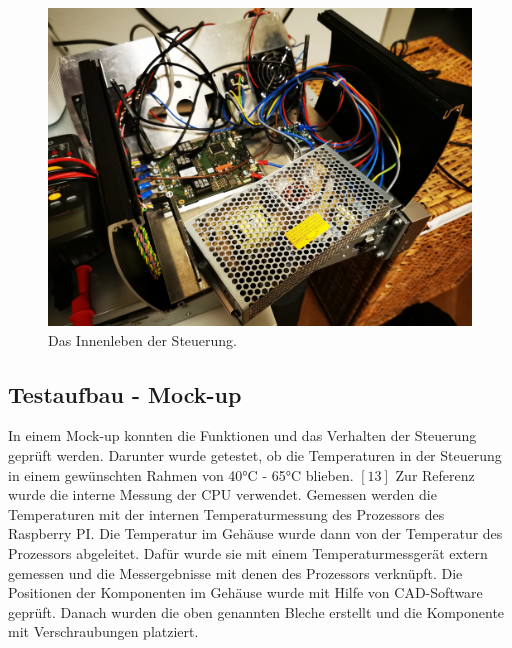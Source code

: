 \begin{figure}[H]
    \centering
    \includegraphics[scale=0.08]{98_images/housing_inside.jpg}
    \caption{Das Innenleben der Steuerung.}
    \label{fig:enter-label}
\end{figure}
\subsection{Testaufbau - Mock-up}
In einem Mock-up konnten die Funktionen und das Verhalten der Steuerung geprüft werden. Darunter wurde getestet, ob die Temperaturen in der Steuerung in einem gewünschten Rahmen von 40°C - 65°C blieben. $[13]$ Zur Referenz wurde die interne Messung der CPU verwendet. Gemessen werden die Temperaturen mit der internen Temperaturmessung des Prozessors des Raspberry PI. Die Temperatur im Gehäuse wurde dann von der Temperatur des Prozessors abgeleitet. Dafür wurde sie mit einem Temperaturmessgerät extern gemessen und die Messergebnisse mit denen des Prozessors verknüpft.
Die Positionen der Komponenten im Gehäuse wurde mit Hilfe von CAD-Software geprüft. Danach wurden die oben genannten Bleche erstellt und die Komponente mit Verschraubungen platziert.